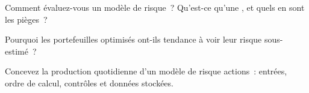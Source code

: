 \begin{interviewq}\label{iq:rs:risk-models:4}
Comment évaluez-vous un modèle de risque~? Qu'est-ce qu'une , et quels en sont les pièges~?
\end{interviewq}

\begin{interviewq}\label{iq:rs:risk-models:5}
Pourquoi les portefeuilles optimisés ont-ils tendance à voir leur risque sous-estimé~?
\end{interviewq}

\begin{interviewq}\label{iq:rs:risk-models:6}
Concevez la production quotidienne d'un modèle de risque actions~: entrées, ordre de calcul, contrôles et données stockées.
\end{interviewq}
